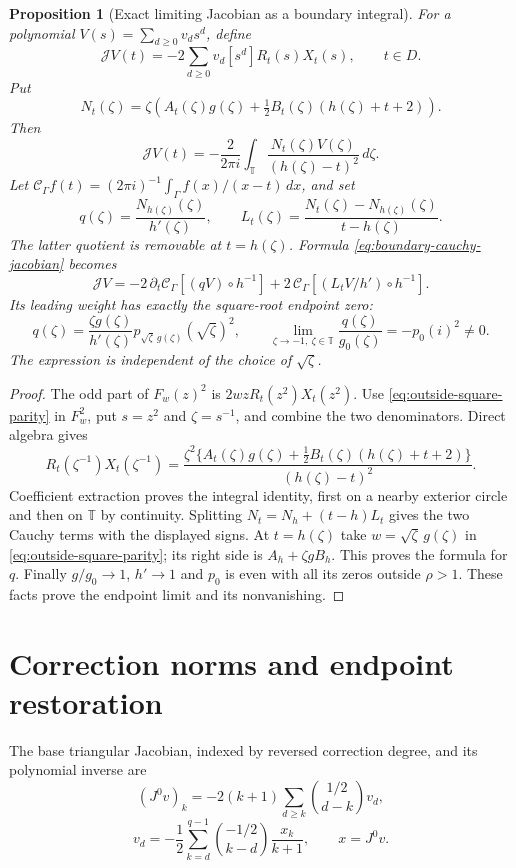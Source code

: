 \documentclass[11pt]{article}
\newtheorem{proposition}{Proposition}[section]
\newcommand{\T}{\mathbb T}
\begin{document}
\begin{proposition}[Exact limiting Jacobian as a boundary integral]
\label{prop:boundary-cauchy-jacobian}
For a polynomial $V(s)=\sum_{d\ge0}v_ds^d$, define
\[
 \mathcal J V(t)=-2\sum_{d\ge0}v_d[s^d]R_t(s)X_t(s),\qquad t\in D.
\]
Put
\[
 N_t(\zeta)=\zeta\left(A_t(\zeta)g(\zeta)
           +\tfrac12 B_t(\zeta)(h(\zeta)+t+2)\right).
\]
Then
\begin{equation}\label{eq:boundary-cauchy-jacobian}
 \mathcal J V(t)=-\frac2{2\pi i}\int_\T
          \frac{N_t(\zeta)V(\zeta)}{(h(\zeta)-t)^2}\,d\zeta.
\end{equation}
Let $\mathcal C_\Gamma f(t)=(2\pi i)^{-1}
\int_\Gamma f(x)/(x-t)\,dx$, and set
\[
 q(\zeta)=\frac{N_{h(\zeta)}(\zeta)}{h'(\zeta)},\qquad
 L_t(\zeta)=\frac{N_t(\zeta)-N_{h(\zeta)}(\zeta)}{t-h(\zeta)}.
\]
The latter quotient is removable at $t=h(\zeta)$. Formula
\eqref{eq:boundary-cauchy-jacobian} becomes
\[
 \mathcal J V=-2\,\partial_t\mathcal C_\Gamma
       [(qV)\circ h^{-1}]
   +2\,\mathcal C_\Gamma[(L_tV/h')\circ h^{-1}].
\]
Its leading weight has exactly the square-root endpoint zero:
\[
 q(\zeta)=\frac{\zeta g(\zeta)}{h'(\zeta)}
          p_{\sqrt\zeta\,g(\zeta)}(\sqrt\zeta)^2,
 \qquad
 \lim_{\zeta\to-1,\ \zeta\in\T}\frac{q(\zeta)}{g_0(\zeta)}
       =-p_0(i)^2\ne0.
\]
The expression is independent of the choice of $\sqrt\zeta$.
\end{proposition}
\begin{proof}
The odd part of $F_w(z)^2$ is $2wzR_t(z^2)X_t(z^2)$.
Use \eqref{eq:outside-square-parity} in $F_w^2$, put $s=z^2$
and $\zeta=s^{-1}$, and combine the two denominators. Direct algebra gives
\[
 R_t(\zeta^{-1})X_t(\zeta^{-1})
 =\frac{\zeta^2\{A_t(\zeta)g(\zeta)
        +\tfrac12 B_t(\zeta)(h(\zeta)+t+2)\}}
        {(h(\zeta)-t)^2}.
\]
Coefficient extraction proves the integral identity, first on a nearby
exterior circle and then on $\T$ by continuity. Splitting
$N_t=N_h+(t-h)L_t$ gives the two Cauchy terms with the displayed signs.
At $t=h(\zeta)$ take $w=\sqrt\zeta\,g(\zeta)$ in
\eqref{eq:outside-square-parity}; its right side is
$A_h+\zeta gB_h$. This proves the formula for $q$.
Finally $g/g_0\to1$, $h'\to1$ and $p_0$ is even with all its zeros
outside $\rho>1$. These facts prove the endpoint limit and its
nonvanishing.
\end{proof}


\section{Correction norms and endpoint restoration}
The base triangular Jacobian, indexed by reversed correction degree,
and its polynomial inverse are
\[
 (J^0v)_k=-2(k+1)\sum_{d\ge k}\binom{1/2}{d-k}v_d,
\]
\begin{equation}\label{eq:base-preconditioner}
 v_d=-\frac12\sum_{k=d}^{q-1}\binom{-1/2}{k-d}
                         \frac{x_k}{k+1},\qquad x=J^0v.
\end{equation}
\end{document}
